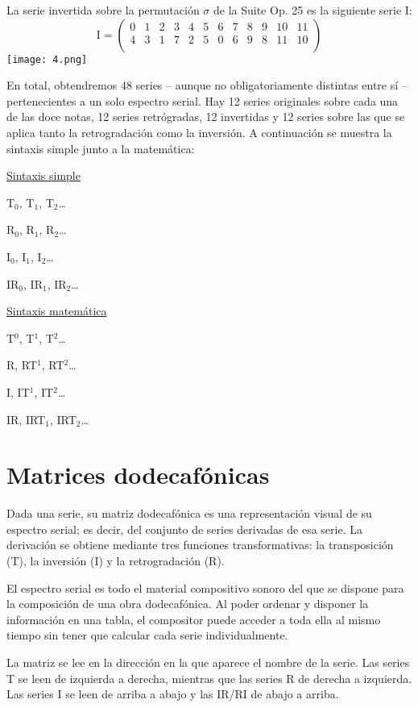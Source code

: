		La serie invertida sobre la permutación $\sigma$ de la Suite Op. 25 es la siguiente serie I:
		$$
		\text{I}=\left(\begin{matrix}0&1&2&3&4&5&6&7&8&9&10&11\\4&3&1&7&2&5&0&6&9&8&11&10\\\end{matrix}\right)
		$$		
		\texttt{[image: 4.png]}
				
		En total, obtendremos 48 series -- aunque no obligatoriamente distintas entre sí -- pertenecientes a un solo espectro serial. Hay 12 series originales sobre cada una de las doce notas, 12 series retrógradas, 12 invertidas y 12 series sobre las que se aplica tanto la retrogradación como la inversión. A continuación se muestra la sintaxis simple junto a la matemática:
		
		\begin{center}
		\begin{multicols}{2}
			\underline{Sintaxis simple}
			
			T$_0$, T$_1$, T$_2$\ldots
			
			R$_0$, R$_1$, R$_2$\ldots
			
			I$_0$, I$_1$, I$_2$\ldots
			
			IR$_0$, IR$_1$, IR$_2$\ldots
			
			\underline{Sintaxis matemática}
			
			T$^0$, T$^1$, T$^2$\ldots
			
			R, RT$^1$, RT$^2$\ldots
			
			I, IT$^1$, IT$^2$\ldots
			
			IR, IRT$_1$, IRT$_2$\ldots
		\end{multicols}
		\end{center}
	
	\section{Matrices dodecafónicas}
		
		Dada una serie, su matriz dodecafónica es una representación visual de su espectro serial; es decir, del conjunto de series derivadas de esa serie. La derivación se obtiene mediante tres funciones transformativas: la transposición (T), la inversión (I) y la retrogradación (R).
		
		El espectro serial es todo el material compositivo sonoro del que se dispone para la composición de una obra dodecafónica. Al poder ordenar y disponer la información en una tabla, el compositor puede acceder a toda ella al mismo tiempo sin tener que calcular cada serie individualmente.
		
		La matriz se lee en la dirección en la que aparece el nombre de la serie. Las series T se leen de izquierda a derecha, mientras que las series R de derecha a izquierda. Las series I se leen de arriba a abajo y las IR/RI de abajo a arriba.
	